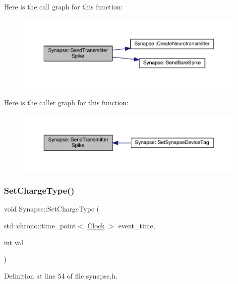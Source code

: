 Here is the call graph for this function\+:\nopagebreak
\begin{figure}[H]
\begin{center}
\leavevmode
\includegraphics[width=350pt]{class_synapse_a4147d3bea8f21918f88bea334f9c4abc_cgraph}
\end{center}
\end{figure}
Here is the caller graph for this function\+:\nopagebreak
\begin{figure}[H]
\begin{center}
\leavevmode
\includegraphics[width=350pt]{class_synapse_a4147d3bea8f21918f88bea334f9c4abc_icgraph}
\end{center}
\end{figure}
\mbox{\label{class_synapse_a87fb31c2758d8fc26e8f2cf4fd7d1af5}} 
\subsubsection{\texorpdfstring{Set\+Charge\+Type()}{SetChargeType()}}
{\footnotesize\ttfamily void Synapse\+::\+Set\+Charge\+Type (\begin{DoxyParamCaption}\item[{std\+::chrono\+::time\+\_\+point$<$ \hyperlink{universe_8h_a0ef8d951d1ca5ab3cfaf7ab4c7a6fd80}{Clock} $>$}]{event\+\_\+time,  }\item[{int}]{val }\end{DoxyParamCaption})\hspace{0.3cm}{\ttfamily [inline]}}



Definition at line 54 of file synapse.\+h.

